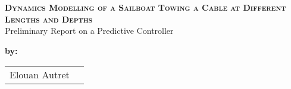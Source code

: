 
\begingroup
\thispagestyle{empty}
\begin{center}
\vspace*{2cm}
{\Huge \textsc{\textbf{Dynamics Modelling of a Sailboat Towing a Cable at Different Lengths and Depths}}}\\


\vspace*{2cm}
{\huge Preliminary Report on a Predictive Controller}\par %
\end{center}

\vspace*{1.5cm}
\textbf{\large by:} 
\begin{center}
{\large
\begin{tabular}{cc}
Elouan Autret \\
\end{tabular}}
\end{center}


